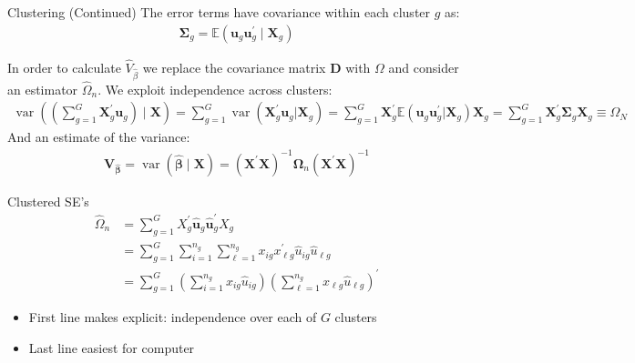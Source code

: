 \documentclass[aspectratio=169,11pt]{beamer}
\begin{document}
\begin{frame}{Clustering (Continued)}
The error terms have covariance within each cluster $g$ as:
\begin{align*}
 \boldsymbol{\Sigma}_ { g } = \mathbb { E } \left( \mathbf{u} _ { g }  \mathbf{ u } _ { g } ^ { \prime } \mid \boldsymbol { X } _ { g } \right)
\end{align*}

In order to calculate $\widehat{V}_{\widehat{\beta}}$ we replace the covariance matrix $\mathbf{D}$ with $\Omega$ and consider an estimator $\widehat{\Omega}_n$. We exploit \alert{independence across clusters}:
\begin{align*}
\operatorname { var } \left( \left( \sum _ { g = 1 } ^ { G } \boldsymbol { X } _ { g } ^ { \prime } \mathbf{u}_ { g } \right) \mid \boldsymbol { X } \right) = \sum _ { g = 1 } ^ { G } \operatorname { var } \left( \boldsymbol { X } _ { g } ^ { \prime } \boldsymbol { u } _ { g } | \boldsymbol { X } _ { g } \right)
= \sum _ { g = 1 } ^ { G } \boldsymbol { X } _ { g } ^ { \prime } \mathbb { E } \left( \boldsymbol { u } _ { g } \boldsymbol { u } _ { g } ^ { \prime } | \boldsymbol { X } _ { g } \right) \boldsymbol { X } _ { g }
= \sum _ { g = 1 } ^ { G } \boldsymbol { X } _ { g } ^ { \prime } \boldsymbol { \Sigma } _ { g } \mathbf { X } _ { g } 
 \equiv \Omega_N
\end{align*}
And an estimate of the variance:
\begin{align*}
\boldsymbol { V } _ { \widehat { \boldsymbol { \beta } } } = \operatorname { var } ( \widehat { \boldsymbol { \beta } } \mid  \boldsymbol { X } )
= \left( \mathbf { X } ^ { \prime } \mathbf { X } \right) ^ { - 1 } \boldsymbol { \Omega } _ { n } \left( \mathbf { X } ^ { \prime } \mathbf { X } \right) ^ { - 1 }
\end{align*}
\end{frame}


\begin{frame}{Clustered SE's}
\begin{align*}
\widehat { \Omega } _ { n } &= \sum _ { g = 1 } ^ { G } X _ { g } ^ { \prime } \widehat {\mathbf{ u }} _ { g }\widehat {\mathbf{ u }}_{g} ^ { \prime } X _ { g }\\
&= \sum _ { g = 1 } ^ { G } \sum _ { i = 1 } ^ { n _ { g } } \sum _ { \ell = 1 } ^ { n _ { g } } x _ { i g } x _ { \ell g } ^ { \prime } \widehat { u } _ { i g } \widehat { u } _ { \ell g }\\
&= \sum _ { g = 1 } ^ { G } \left( \sum _ { i = 1 } ^ { n _ { g } } x _ { i g } \widehat { u } _ { i g } \right) \left( \sum _ { \ell = 1 } ^ { n _ { g } } x _ { \ell g } \widehat { u } _ { \ell g } \right) ^ { \prime }
\end{align*}
\begin{itemize}
\item First line makes explicit: independence over each of $G$ clusters
\item Last line easiest for computer
\end{itemize}
\end{frame}
\end{document}
